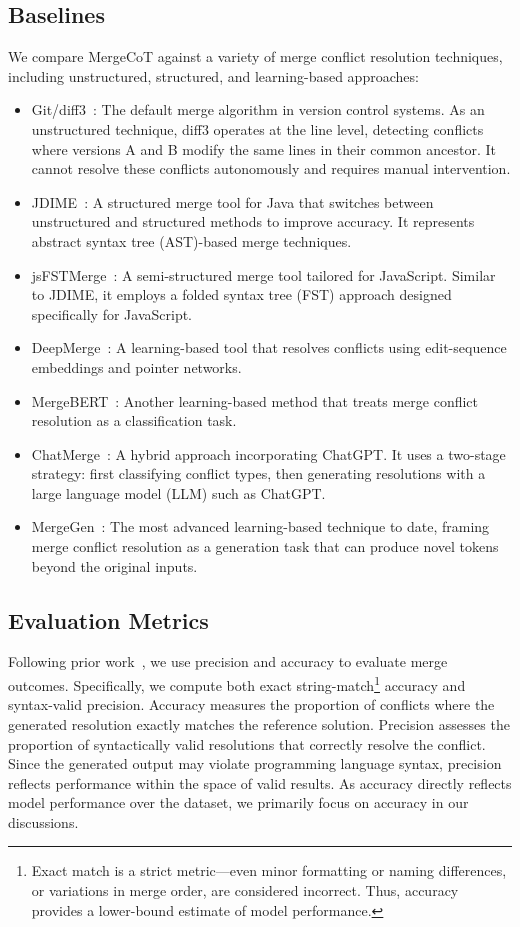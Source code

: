 \documentclass[sigconf,review,anonymous]{acmart}
\begin{document}
\subsection{Baselines}
We compare MergeCoT against a variety of merge conflict resolution techniques, including unstructured, structured, and learning-based approaches:
\begin{itemize}
    \item Git/diff3~\cite{9}: The default merge algorithm in version control systems. As an unstructured technique, diff3 operates at the line level, detecting conflicts where versions A and B modify the same lines in their common ancestor. It cannot resolve these conflicts autonomously and requires manual intervention.
    \item JDIME~\cite{11}: A structured merge tool for Java that switches between unstructured and structured methods to improve accuracy. It represents abstract syntax tree (AST)-based merge techniques.
    \item jsFSTMerge~\cite{10}: A semi-structured merge tool tailored for JavaScript. Similar to JDIME, it employs a folded syntax tree (FST) approach designed specifically for JavaScript.
    \item DeepMerge~\cite{deepmerge}: A learning-based tool that resolves conflicts using edit-sequence embeddings and pointer networks.
    \item MergeBERT~\cite{mergebert}: Another learning-based method that treats merge conflict resolution as a classification task.
    \item ChatMerge~\cite{17}: A hybrid approach incorporating ChatGPT. It uses a two-stage strategy: first classifying conflict types, then generating resolutions with a large language model (LLM) such as ChatGPT.
    \item MergeGen~\cite{mergegen}: The most advanced learning-based technique to date, framing merge conflict resolution as a generation task that can produce novel tokens beyond the original inputs.
\end{itemize}

\subsection{Evaluation Metrics}
Following prior work~\cite{deepmerge, mergebert, 17, mergegen}, we use precision and accuracy to evaluate merge outcomes. Specifically, we compute both exact string-match\footnote{Exact match is a strict metric—even minor formatting or naming differences, or variations in merge order, are considered incorrect. Thus, accuracy provides a lower-bound estimate of model performance.}
accuracy and syntax-valid precision. Accuracy measures the proportion of conflicts where the generated resolution exactly matches the reference solution. Precision assesses the proportion of syntactically valid resolutions that correctly resolve the conflict. Since the generated output may violate programming language syntax, precision reflects performance within the space of valid results. As accuracy directly reflects model performance over the dataset, we primarily focus on accuracy in our discussions.
\end{document}
